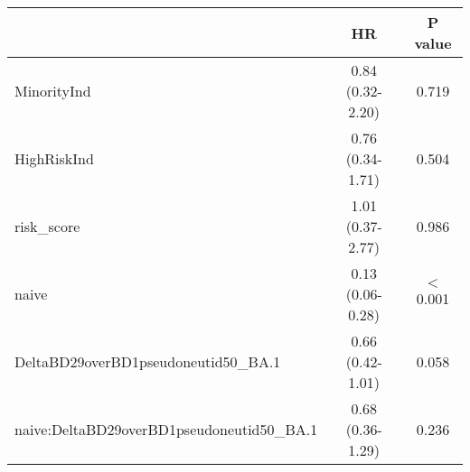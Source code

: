 \begin{tabular}{lcc}
   \hline  &HR& P value\\ 
\hline
MinorityInd & 0.84 (0.32-2.20) & 0.719 \\ 
  HighRiskInd & 0.76 (0.34-1.71) & 0.504 \\ 
  risk\_score & 1.01 (0.37-2.77) & 0.986 \\ 
  naive & 0.13 (0.06-0.28) & $<$0.001 \\ 
  DeltaBD29overBD1pseudoneutid50\_BA.1 & 0.66 (0.42-1.01) & 0.058 \\ 
  naive:DeltaBD29overBD1pseudoneutid50\_BA.1 & 0.68 (0.36-1.29) & 0.236 \\ 
   \hline
\end{tabular}

